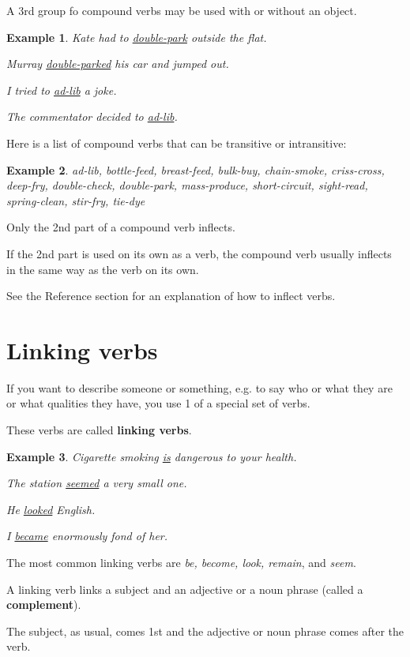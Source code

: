 \documentclass[oneside]{book}
\numberwithin{equation}{section}
\newtheorem{example}{Example}[section]
\begin{document}
%
\noindent{} A 3rd group fo compound verbs may be used with or without an object.
\begin{example}
    Kate had to \underline{double-park} outside the flat.
    
    Murray \underline{double-parked} his car and jumped out.
    
    I tried to \underline{ad-lib} a joke.
    
    The commentator decided to \underline{ad-lib}.
\end{example}
Here is a list of compound verbs that can be transitive or intransitive:
\begin{example}
    ad-lib, bottle-feed, breast-feed, bulk-buy, chain-smoke, criss-cross, deep-fry, double-check, double-park, mass-produce, short-circuit, sight-read, spring-clean, stir-fry, tie-dye
\end{example}
%
\noindent{} Only the 2nd part of a compound verb inflects.

If the 2nd part is used on its own as a verb, the compound verb usually inflects in the same way as the verb on its own.

%
See the Reference section for an explanation of how to inflect verbs.

\section{Linking verbs}
\noindent{} If you want to describe someone or something, e.g. to say who or what they are or what qualities they have, you use 1 of a special set of verbs.

These verbs are called \textbf{linking verbs}.
\begin{example}
    Cigarette smoking \underline{is} dangerous to your health.
    
    The station \underline{seemed} a very small one.
    
    He \underline{looked} English.
    
    I \underline{became} enormously fond of her.
\end{example}
The most common linking verbs are \textit{be, become, look, remain}, and \textit{seem}.

%
\noindent{} A linking verb links a subject and an adjective or a noun phrase (called a \textbf{complement}).

The subject, as usual, comes 1st and the adjective or noun phrase comes after the verb.
\end{document}
